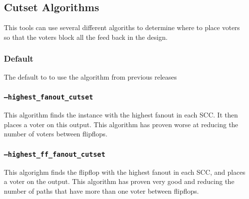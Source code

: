 \subsection{Cutset Algorithms}
This tools can use several different algoriths to determine where to place
voters so that the voters block all the feed back in the design. 

\subsubsection{Default}
The default to to use the algorithm from previous releases

\subsubsection{\texttt{--highest\_fanout\_cutset}}
This algorithm finds the instance with the highest fanout in each SCC.
It then places a voter on this output. This algorithm has proven worse 
at reducing the number of voters between flipflops.

\subsubsection{\texttt{--highest\_ff\_fanout\_cutset}}
This algorighm finds the flipflop with the highest fanout in each SCC, and 
places a voter on the output. This algorithm has proven very good and reducing 
the number of paths that have more than one voter between flipflops.




